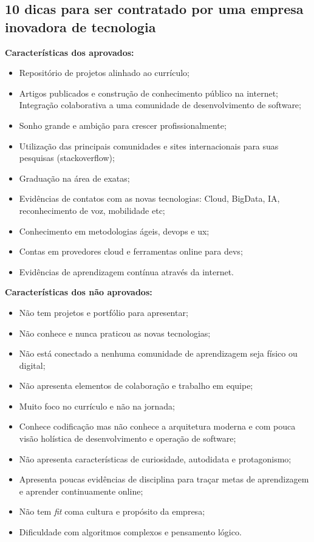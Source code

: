 \documentclass[12pt,a4paper]{article}
\begin{document}
	\subsection{10 dicas para ser contratado por uma empresa inovadora de tecnologia}
	
	\textbf{	Características dos aprovados:}
	\begin{itemize}
		\item Repositório de projetos alinhado ao currículo;
		\item Artigos publicados e construção de conhecimento público na internet;
		Integração colaborativa a uma comunidade de desenvolvimento de software;
		\item Sonho grande e ambição para crescer profissionalmente;
		\item Utilização das principais comunidades e sites internacionais para suas pesquisas (stackoverflow);
		\item Graduação na área de exatas;
		\item Evidências de contatos com as novas tecnologias: Cloud, BigData, IA, reconhecimento de voz, mobilidade etc;
		\item Conhecimento em metodologias ágeis, devops e ux;
		\item Contas em provedores cloud e ferramentas online para devs;
		\item Evidências de aprendizagem contínua através da internet.
	\end{itemize}

	\textbf{Características dos não aprovados:}
	\begin{itemize}
		\item Não tem projetos e portfólio para apresentar;
		\item Não conhece e nunca praticou as novas tecnologias;
		\item Não está conectado a nenhuma comunidade de aprendizagem seja físico ou digital;
		\item Não apresenta elementos de colaboração e trabalho em equipe;
		\item Muito foco no currículo e não na jornada;
		\item Conhece codificação mas não conhece a arquitetura moderna e com pouca visão holística de desenvolvimento e operação de software;
		\item Não apresenta características de curiosidade, autodidata e protagonismo;
		\item Apresenta poucas evidências de disciplina para traçar metas de aprendizagem e aprender continuamente online;
		\item Não tem \textit{fit} coma cultura e propósito da empresa;
		\item Dificuldade com algoritmos complexos e pensamento lógico.
	\end{itemize}
	
\end{document}
